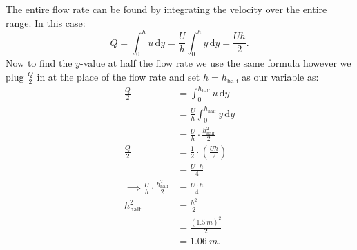The entire flow rate can be found by integrating the velocity over the entire range. In this case:
\[ 
Q = \int_{0}^{h} u \, \mathrm{d}y = \frac{U}{h} \int_{0}^{h} y \, \mathrm{d}y = \frac{U h}{2}
.\]
Now to find the $y$-value at half the flow rate we use the same formula however we plug $\frac{Q}{2}$ in at the place of the flow rate and set $h = h_{\mathrm{half}}$ as our variable as:
\begin{align*}
  \frac{Q}{2} &= \int_{0}^{h_{\mathrm{half}}} u \, \mathrm{d}y  \\
  &= \frac{U}{h} \int_{0}^{h_{\mathrm{half}}}  y \, \mathrm{d}y \\
  &= \frac{U}{h} \cdot \frac{h_{\mathrm{half}}^2}{2} \\
  \frac{Q}{2} &= \frac{1}{2} \cdot \left( \frac{U h}{2} \right) \\
  &= \frac{U \cdot h}{4} \\
  \implies \frac{U}{h} \cdot \frac{h_{\mathrm{half}}^2}{2} &= \frac{U \cdot h}{4} \\
  h_{\mathrm{half}}^2 &= \frac{h^2}{2} \\
                      &= \frac{(\qty{1,5}{m} )^2}{2} \\
                      &= \qty{1,06}{m} 
.\end{align*}

